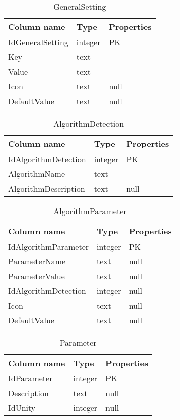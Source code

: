 \begin{table}[H] 
\caption{GeneralSetting}
\centering
\begin{tabular}{| p{4cm} | p{3cm} | p{3cm}|}
\hline
\textbf{Column name} & \textbf{Type} & \textbf{Properties}  \\ \hline
IdGeneralSetting & integer & PK  \\ \hline
Key & text &   \\ \hline
Value & text &   \\ \hline
Icon & text & null  \\ \hline
DefaultValue & text & null  \\ \hline
\end{tabular}
\end{table}

\begin{table}[H] 
\caption{AlgorithmDetection}
\centering
\begin{tabular}{| p{4cm} | p{3cm} | p{3cm}|}
\hline
\textbf{Column name} & \textbf{Type} & \textbf{Properties}  \\ \hline
IdAlgorithmDetection & integer & PK  \\ \hline
AlgorithmName & text &   \\ \hline
AlgorithmDescription & text & null  \\ \hline
\end{tabular}
\end{table}

\begin{table}[H] 
\caption{AlgorithmParameter}
\centering
\begin{tabular}{| p{4cm} | p{3cm} | p{3cm}|}
\hline
\textbf{Column name} & \textbf{Type} & \textbf{Properties}  \\ \hline
IdAlgorithmParameter & integer & PK  \\ \hline
ParameterName & text & null  \\ \hline
ParameterValue & text & null  \\ \hline
IdAlgorithmDetection & integer & null  \\ \hline
Icon & text & null  \\ \hline
DefaultValue & text & null  \\ \hline
\end{tabular}
\end{table}

\begin{table}[H] 
\caption{Parameter}
\centering
\begin{tabular}{| p{4cm} | p{3cm} | p{3cm}|}
\hline
\textbf{Column name} & \textbf{Type} & \textbf{Properties}  \\ \hline
IdParameter & integer & PK  \\ \hline
Description & text & null  \\ \hline
IdUnity & integer & null  \\ \hline
\end{tabular}
\end{table}

